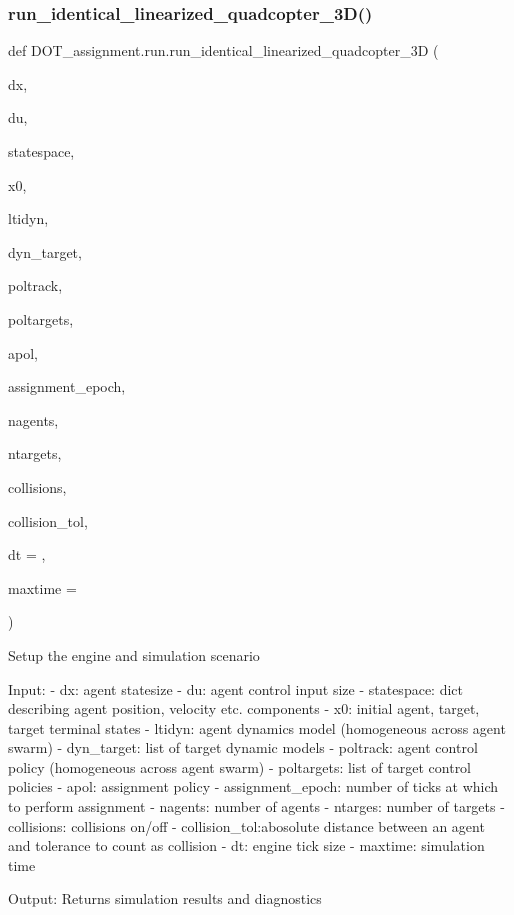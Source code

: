 \subsubsection{\texorpdfstring{run\_identical\_linearized\_quadcopter\_3D()}{run\_identical\_linearized\_quadcopter\_3D()}}
{\footnotesize\ttfamily def D\+O\+T\+\_\+assignment.\+run.\+run\+\_\+identical\+\_\+linearized\+\_\+quadcopter\+\_\+3D (\begin{DoxyParamCaption}\item[{}]{dx,  }\item[{}]{du,  }\item[{}]{statespace,  }\item[{}]{x0,  }\item[{}]{ltidyn,  }\item[{}]{dyn\+\_\+target,  }\item[{}]{poltrack,  }\item[{}]{poltargets,  }\item[{}]{apol,  }\item[{}]{assignment\+\_\+epoch,  }\item[{}]{nagents,  }\item[{}]{ntargets,  }\item[{}]{collisions,  }\item[{}]{collision\+\_\+tol,  }\item[{}]{dt = {},  }\item[{}]{maxtime = {} }\end{DoxyParamCaption})}

\begin{DoxyVerb}Setup the engine and simulation scenario

Input:
    - dx:           agent statesize
    - du:           agent control input size
    - statespace:   dict describing agent position, velocity etc. components
    - x0:           initial agent, target, target terminal states
    - ltidyn:       agent dynamics model (homogeneous across agent swarm)
    - dyn_target:   list of target dynamic models
    - poltrack:     agent control policy (homogeneous across agent swarm)
    - poltargets:   list of target control policies
    - apol:         assignment policy
    - assignment_epoch: number of ticks at which to perform assignment
    - nagents:      number of agents
    - ntarges:      number of targets
    - collisions:   collisions on/off
    - collision_tol:abosolute distance between an agent and tolerance to count as collision
    - dt:           engine tick size
    - maxtime:      simulation time

Output: Returns simulation results and diagnostics\end{DoxyVerb}
 